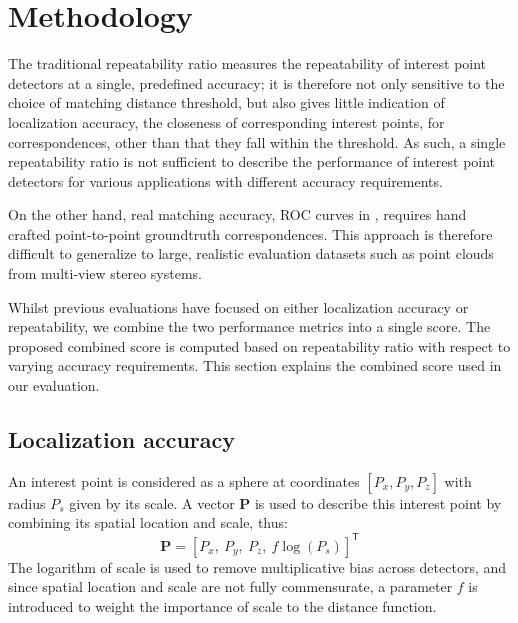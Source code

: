 \section{Methodology}
\label{sec:methodology}

The traditional repeatability ratio measures the repeatability of interest point detectors at a single, predefined accuracy; it is therefore not only sensitive to the choice of matching distance threshold, but also gives little indication of localization accuracy, \ie the closeness of corresponding interest points, for correspondences, other than that they fall within the threshold. As such, a single repeatability ratio is not sufficient to describe the performance of interest point detectors for various applications with different accuracy requirements. 

On the other hand, real matching accuracy, \eg ROC curves in \cite{Bowyer1999}, requires hand crafted point-to-point groundtruth correspondences. This approach is therefore difficult to generalize to large, realistic evaluation datasets such as point clouds from multi-view stereo systems.   

Whilst previous evaluations have focused on either localization accuracy or repeatability, we combine the two performance metrics into a single score. The proposed combined score is computed based on repeatability ratio with respect to varying accuracy requirements. This section explains the combined score used in our evaluation.   

\subsection{Localization accuracy}

An interest point is considered as a sphere at coordinates $[P_x, P_y, P_z]$ with radius $P_s$ given by its scale. A vector $\mathbf{P}$ is used to describe this interest point by combining its spatial location and scale, thus: 
\begin{equation}
\mathbf{P} = [P_x,~P_y,~P_z,~f\log(P_s)]^\mathsf{T}
\label{eq:loc_vec}
\end{equation}
The logarithm of scale is used to remove multiplicative bias across detectors, and since spatial location and scale are not fully commensurate, a parameter $f$ is introduced to weight the importance of scale to the distance function.

